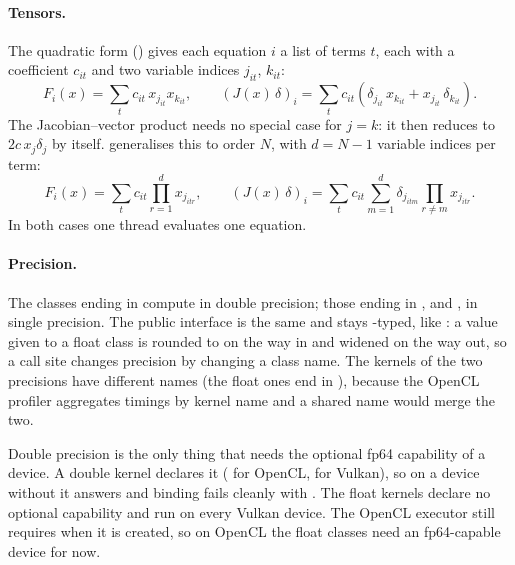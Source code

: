 \documentclass[main.tex]{subfiles}
\begin{document}
    \paragraph{Tensors.}
    The quadratic form () gives each equation $i$ a list of terms $t$, each with a coefficient $c_{it}$ and two variable indices $j_{it}$, $k_{it}$:
    \begin{equation}
        F_i(x) = \sum_t c_{it}\, x_{j_{it}} x_{k_{it}}, \qquad
        (J(x)\,\delta)_i = \sum_t c_{it}\left(\delta_{j_{it}}\, x_{k_{it}} + x_{j_{it}}\, \delta_{k_{it}}\right).
    \end{equation}
    The Jacobian--vector product needs no special case for $j=k$: it then reduces to $2c\,x_j\delta_j$ by itself.  generalises this to order $N$, with $d=N-1$ variable indices per term:
    \begin{equation}
        F_i(x) = \sum_t c_{it} \prod_{r=1}^{d} x_{j_{itr}}, \qquad
        (J(x)\,\delta)_i = \sum_t c_{it} \sum_{m=1}^{d} \delta_{j_{itm}} \prod_{r \neq m} x_{j_{itr}} .
    \end{equation}
    In both cases one thread evaluates one equation.

    \paragraph{Precision.}
    The classes ending in  compute in double precision; those ending in , and , in single precision. The public interface is the same and stays -typed, like : a value given to a float class is rounded to  on the way in and widened on the way out, so a call site changes precision by changing a class name. The kernels of the two precisions have different names (the float ones end in ), because the OpenCL profiler aggregates timings by kernel name and a shared name would merge the two.

    Double precision is the only thing that needs the optional fp64 capability of a device. A double kernel declares it ( for OpenCL,  for Vulkan), so on a device without it  answers  and binding fails cleanly with . The float kernels declare no optional capability and run on every Vulkan device. The OpenCL executor still requires  when it is created, so on OpenCL the float classes need an fp64-capable device for now.
\end{document}
